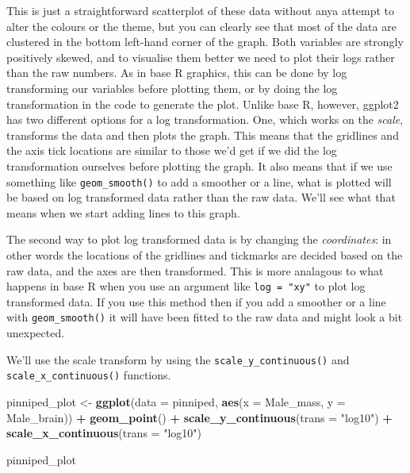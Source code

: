 \documentclass[
]{book}
\newenvironment{Shaded}{\begin{snugshade}}{\end{snugshade}}
\newcommand{\DataTypeTok}[1]{\textcolor[rgb]{0.13,0.29,0.53}{#1}}
\newcommand{\KeywordTok}[1]{\textcolor[rgb]{0.13,0.29,0.53}{\textbf{#1}}}
\newcommand{\NormalTok}[1]{#1}
\newcommand{\OperatorTok}[1]{\textcolor[rgb]{0.81,0.36,0.00}{\textbf{#1}}}
\newcommand{\StringTok}[1]{\textcolor[rgb]{0.31,0.60,0.02}{#1}}
\begin{document}
This is just a straightforward scatterplot of these data without anya attempt to alter the colours or the theme, but you can clearly see that most of the data are clustered in the bottom left-hand corner of the graph. Both variables are strongly positively skewed, and to visualise them better we need to plot their logs rather than the raw numbers. As in base R graphics, this can be done by log transforming our variables before plotting them, or by doing the log transformation in the code to generate the plot. Unlike base R, however, ggplot2 has two different options for a log transformation. One, which works on the \emph{scale}, transforms the data and then plots the graph. This means that the gridlines and the axis tick locations are similar to those we'd get if we did the log transformation ourselves before plotting the graph. It also means that if we use something like \texttt{geom\_smooth()} to add a smoother or a line, what is plotted will be based on log transformed data rather than the raw data. We'll see what that means when we start adding lines to this graph.

The second way to plot log transformed data is by changing the \emph{coordinates}: in other words the locations of the gridlines and tickmarks are decided based on the raw data, and the axes are then transformed. This is more analagous to what happens in base R when you use an argument like \texttt{log\ =\ "xy"} to plot log transformed data. If you use this method then if you add a smoother or a line with \texttt{geom\_smooth()} it will have been fitted to the raw data and might look a bit unexpected.

We'll use the scale transform by using the \texttt{scale\_y\_continuous()} and \texttt{scale\_x\_continuous()} functions.

\begin{Shaded}
\begin{Highlighting}[]

\NormalTok{pinniped_plot <-}\StringTok{ }\KeywordTok{ggplot}\NormalTok{(}\DataTypeTok{data =}\NormalTok{ pinniped, }\KeywordTok{aes}\NormalTok{(}\DataTypeTok{x =}\NormalTok{ Male_mass, }\DataTypeTok{y =}\NormalTok{ Male_brain)) }\OperatorTok{+}
\StringTok{        }\KeywordTok{geom_point}\NormalTok{() }\OperatorTok{+}\StringTok{ }
\StringTok{        }\KeywordTok{scale_y_continuous}\NormalTok{(}\DataTypeTok{trans =} \StringTok{"log10"}\NormalTok{) }\OperatorTok{+}
\StringTok{        }\KeywordTok{scale_x_continuous}\NormalTok{(}\DataTypeTok{trans =} \StringTok{"log10"}\NormalTok{)}

\NormalTok{pinniped_plot}
\end{Highlighting}
\end{Shaded}
\end{document}
